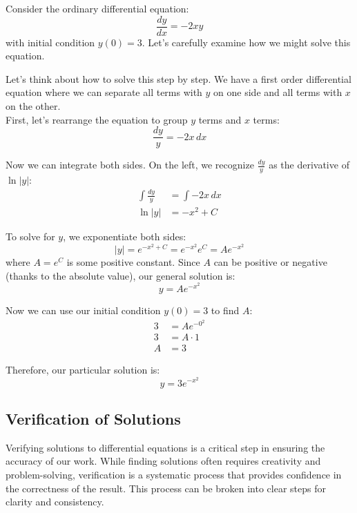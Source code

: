 \exampleline
\begin{example}
Consider the ordinary differential equation:
\[
\frac{dy}{dx} = -2xy
\]
with initial condition $y(0) = 3$. Let's carefully examine how we might solve this equation.

\begin{solution}
Let's think about how to solve this step by step. We have a first order differential equation where we can separate all terms with $y$ on one side and all terms with $x$ on the other. \\

\noindent First, let's rearrange the equation to group $y$ terms and $x$ terms:
\[
\frac{dy}{y} = -2x\,dx
\]

\noindent Now we can integrate both sides. On the left, we recognize $\frac{dy}{y}$ as the derivative of $\ln|y|$:
\begin{align*}
\int \frac{dy}{y} &= \int -2x\,dx \\
\ln|y| &= -x^2 + C
\end{align*}

\noindent To solve for $y$, we exponentiate both sides:
\[
|y| = e^{-x^2 + C} = e^{-x^2}e^C = Ae^{-x^2}
\]
where $A = e^C$ is some positive constant. Since $A$ can be positive or negative (thanks to the absolute value), our general solution is:
\[
y = Ae^{-x^2}
\]

\noindent Now we can use our initial condition $y(0) = 3$ to find $A$:
\begin{align*}
3 &= Ae^{-0^2} \\
3 &= A \cdot 1 \\
A &= 3
\end{align*}

\noindent Therefore, our particular solution is:
\[
y = 3e^{-x^2}
\]
\end{solution}
\end{example}
\exampleline
\subsection*{Verification of Solutions} 

\noindent Verifying solutions to differential equations is a critical step in ensuring the accuracy of our work. While finding solutions often requires creativity and problem-solving, verification is a systematic process that provides confidence in the correctness of the result. This process can be broken into clear steps for clarity and consistency. \\

